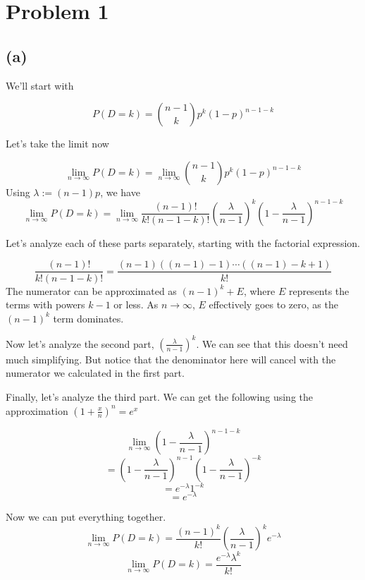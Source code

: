 \documentclass{article}
\begin{document}
\section*{Problem 1}
\subsection*{(a)}
We'll start with

\[ P(D = k) = \binom{n - 1}{k} p^k (1 - p)^{n - 1 - k} \]

\noindent Let's take the limit now

\[ \lim_{n \rightarrow \infty} P(D = k) = \lim_{n \rightarrow \infty} 
    \binom{n - 1}{k} p^k (1 - p)^{n - 1 - k} \]
Using $\lambda := (n - 1)p$, we have 
\[ \lim_{n \rightarrow \infty} P(D = k) = \lim_{n \rightarrow \infty} 
    \frac{(n - 1)!}{k!(n - 1 - k)!} (\frac{\lambda}{n - 1})^k (1 - \frac{\lambda}{n - 1})^{n - 1 - k} \]

\noindent Let's analyze each of these parts separately, starting with the 
factorial expression.

\[ \frac{(n - 1)!}{k!(n - 1 - k)!} = \frac{(n - 1)((n - 1) - 1)\cdots((n - 1) - k + 1)}{k!} \]
The numerator can be approximated as $(n - 1)^k + E$, where
$E$ represents the terms with powers $k - 1$ or less. As $n \rightarrow \infty$, 
$E$ effectively goes to zero, as the $(n - 1)^k$ term dominates.

\noindent Now let's analyze the second part, $(\frac{\lambda}{n - 1})^k$. We can
see that this doesn't need much simplifying. But notice that the denominator here
will cancel with the numerator we calculated in the first part.

\noindent Finally, let's analyze the third part. We can get the following using the 
approximation $(1 + \frac{x}{n})^n = e^x$ 

\[ \lim_{n \rightarrow \infty} (1 - \frac{\lambda}{n - 1})^{n - 1 - k} \]
\[ = (1 - \frac{\lambda}{n - 1})^{n - 1} (1 - \frac{\lambda}{n - 1})^{-k} \]
\[ = e^{-\lambda} 1^{-k} \]
\[ = e^{-\lambda} \]

\noindent Now we can put everything together.
\[ \lim_{n \rightarrow \infty} P(D = k) = \frac{(n - 1)^k }{k!} (\frac{\lambda}{n - 1})^k
    e^{-\lambda} \]
\[ \lim_{n \rightarrow \infty} P(D = k) = \frac{e^{-\lambda} \lambda^k}{k!} \]
\end{document}
